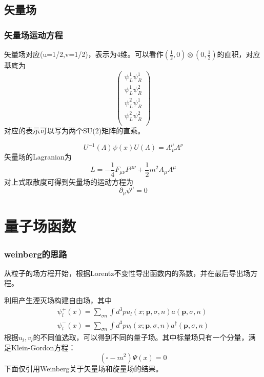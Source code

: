\documentclass[aspectratio=1610,12pt]{beamer}
\begin{document}
\subsection{矢量场}
\begin{frame}
    \frametitle{矢量场运动方程}
    矢量场对应(u=1/2,v=1/2)，表示为4维。可以看作$(\frac{1}{2},0)\otimes (0,\frac{1}{2})$的直积，对应基底为
    \begin{equation}
        \left(\begin{array}{c}
            \psi^1_{L}\psi^1_R\\
            \psi^1_L\psi^2_R\\
            \psi^2_L\psi^1_R\\
            \psi^2_L\psi^2_R\\
        \end{array}\right)
    \end{equation}
    对应的表示可以写为两个SU(2)矩阵的直乘。

    \begin{equation}
        U^{-1}(\Lambda)\psi(x)U(\Lambda)=\Lambda^{\mu}_{\ \nu} A^\nu
    \end{equation}
    矢量场的Lagranian为\cite{Lancaster}
    \begin{equation}
        L=-\frac{1}{4}F_{\mu\nu}F^{\mu\nu}+\frac{1}{2}m^2A_\mu A^\mu
    \end{equation}
    对上式取散度可得到矢量场的运动方程为
    \begin{equation}
        \partial_\mu\psi^\mu=0
    \end{equation}
\end{frame}
\section{量子场函数}
\begin{frame}
    \frametitle{weinberg的思路}
    从粒子的场方程开始，根据Lorentz不变性导出函数内的系数，并在最后导出场方程。

    利用产生湮灭场构建自由场，其中
    \begin{align}
        \psi^+_l(x)=\sum_{\sigma n}{\int{d^3pu_l(x;\mathbf{p},\sigma,n)a(\mathbf{p},\sigma,n)}}\\
        \psi^-_l(x)=\sum_{\sigma n}{\int{d^3pv_l(x;\mathbf{p},\sigma,n)a^\dagger(\mathbf{p},\sigma,n)}}
    \end{align}
    根据$u_l,v_l$的不同值选取，可以得到不同的量子场\cite{weinberg}。其中标量场只有一个分量，满足Klein-Gordon方程\cite{weinberg}：
    \begin{equation}
        (\square-m^2)\Psi(x)=0
    \end{equation}
    下面仅引用Weinberg关于矢量场和旋量场的结果。
\end{frame}
\end{document}
